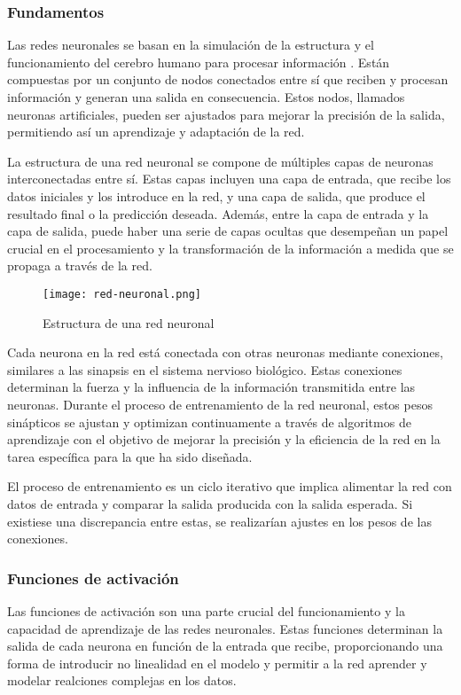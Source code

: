 \subsubsection{Fundamentos}
Las redes neuronales se basan en la simulación de la estructura y el funcionamiento del cerebro humano para procesar información \cite{redes-open}. Están compuestas por un conjunto de nodos conectados entre sí que reciben y procesan información y generan una salida en consecuencia. Estos nodos, llamados neuronas artificiales, pueden ser ajustados para mejorar la precisión de la salida, permitiendo así un aprendizaje y adaptación de la red.

La estructura de una red neuronal se compone de múltiples capas de neuronas interconectadas entre sí. Estas capas incluyen una capa de entrada, que recibe los datos iniciales y los introduce en la red, y una capa de salida, que produce el resultado final o la predicción deseada. Además, entre la capa de entrada y la capa de salida, puede haber una serie de capas ocultas que desempeñan un papel crucial en el procesamiento y la transformación de la información a medida que se propaga a través de la red.

\begin{figure}[ht]
    \centering
    \texttt{[image: red-neuronal.png]}
    \caption{Estructura de una red neuronal}
    \label{fig:red-neuronal}
\end{figure}

Cada neurona en la red está conectada con otras neuronas mediante conexiones, similares a las sinapsis en el sistema nervioso biológico. Estas conexiones determinan la fuerza y la influencia de la información transmitida entre las neuronas. Durante el proceso de entrenamiento de la red neuronal, estos pesos sinápticos se ajustan y optimizan continuamente a través de algoritmos de aprendizaje con el objetivo de mejorar la precisión y la eficiencia de la red en la tarea específica para la que ha sido diseñada.

El proceso de entrenamiento es un ciclo iterativo que implica alimentar la red con datos de entrada y comparar la salida producida con la salida esperada. Si existiese una discrepancia entre estas, se realizarían ajustes en los pesos de las conexiones.

\subsubsection{Funciones de activación}
Las funciones de activación son una parte crucial del funcionamiento y la capacidad de aprendizaje de las redes neuronales. Estas funciones determinan la salida de cada neurona en función de la entrada que recibe, proporcionando una forma de introducir no linealidad en el modelo y permitir a la red aprender y modelar realciones complejas en los datos.

